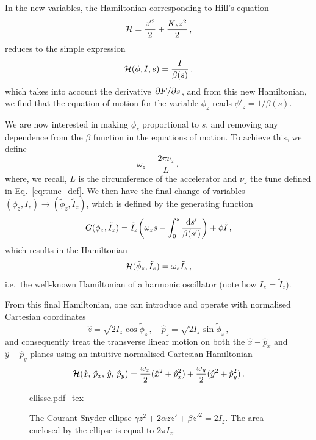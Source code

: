 In the new variables, the Hamiltonian corresponding to Hill's equation
\begin{equation} 
    \mathcal{H} = \frac{z'^2}{2} + \frac{K_z z^2}{2} \,,
\end{equation}
reduces to the simple expression
\begin{equation}
	\mathcal{H}(\phi,I,s) = \frac{I}{\beta(s)}\, ,
\end{equation}
which takes into account the derivative $\pdv*{F}{s}$, and from this new Hamiltonian, we find that the equation of motion for the variable $\phi_z$ reads $\phi'_z = 1/\beta(s)$. 

We are now interested in making $\phi_z$ proportional to $s$, and removing any dependence from the $\beta$ function in the equations of motion. To achieve this, we define 
\begin{equation}
    \omega_z = \frac{2\pi\nu_z}{L} \,,
\end{equation}
where, we recall, $L$ is the circumference of the accelerator and $\nu_z$ the tune defined in Eq.~\eqref{eq:tune_def}. We then have the final change of variables $(\phi_z,I_z)\to(\tilde\phi_z, \tilde I_z)$, which is defined by the generating function
%
\begin{equation}
	G(\phi_z,\tilde I_z) = \tilde I_z\qty(\omega_z s - \int_0^s\frac{\dd s'}{\beta(s')})+\phi\tilde I\, ,
\end{equation}
%
which results in the Hamiltonian
%
\begin{equation}
	\mathcal{H}(\tilde \phi_z,\tilde I_z) = \omega_z \tilde I_z\,,
	\label{eq:harm_ham}
 \end{equation}
%
i.e.\ the well-known Hamiltonian of a harmonic oscillator (note how $I_z$ = $\tilde{I}_z$).

From this final Hamiltonian, one can introduce and operate with normalised Cartesian coordinates 
\begin{equation}
    \hat z=\sqrt{2I_z}\cos\tilde{\phi}_z\,,\quad \hat p_z=\sqrt{2I_z}\sin\tilde{\phi}_z \,,
    \label{eq:2:cart_eq}
\end{equation}
and consequently treat the transverse linear motion on both the $\hat x-\hat p_x$ and $\hat y-\hat p_y$ planes using an intuitive normalised Cartesian Hamiltonian
%
\begin{equation}
	\mathcal{H}(\hat x,\, \hat p_x,\, \hat y,\, \hat p_y) = \frac{\omega_x}{2}(\hat x^2 +\hat p_x^2) + \frac{\omega_y}{2}(\hat y^2+\hat p_y^2)\, .
	\label{eq:linham}
\end{equation}
%

\begin{figure}
    \centering
    \def\svgwidth{0.75\columnwidth}
    {ellisse.pdf_tex}
    \caption{The Courant-Snyder ellipse $\gamma z^2 + 2\alpha zz' + \beta z'^2=2I_z$. The area enclosed by the ellipse is equal to $2\pi I_z$. }
    \label{fig:coursnyd}
\end{figure}


